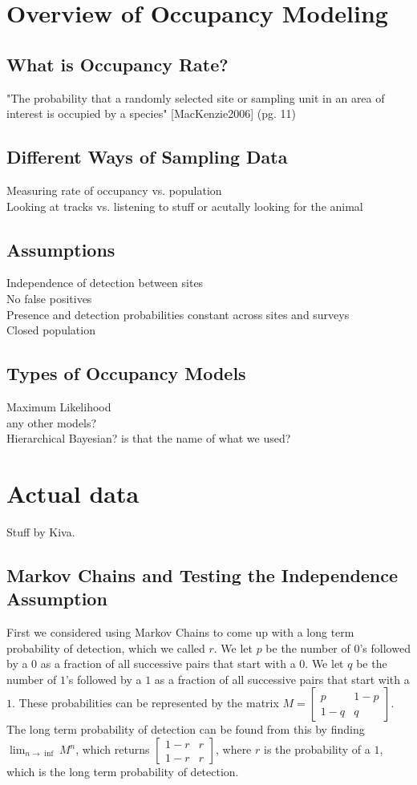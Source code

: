 \documentclass{article}
\begin{document}
\section{Overview of Occupancy Modeling}
	\subsection{What is Occupancy Rate?}
		"The probability that a randomly selected site or sampling unit in an area 
			of interest is occupied by a species" [MacKenzie2006] (pg. 11)
	\subsection{Different Ways of Sampling Data}
		Measuring rate of occupancy vs. population \\
		Looking at tracks vs. listening to stuff or acutally looking for the animal
	\subsection{Assumptions}
		Independence of detection between sites \\
		No false positives \\
		Presence and detection probabilities constant across sites and surveys \\
		Closed population
	\subsection{Types of Occupancy Models}
		Maximum Likelihood \\
		any other models? \\
		Hierarchical Bayesian?  is that the name of what we used?

\section{Actual data}
Stuff by Kiva.
	\subsection{Markov Chains and Testing the Independence Assumption}

		First we considered using Markov Chains to come up with a long term 
probability of detection, which we called \(r\).  We let \(p\) be the number of 
\(0\)'s followed by a \(0\) as a fraction of all successive pairs that start with 
a \(0\).  We let \(q\) be the number of \(1\)'s followed by a \(1\) as a fraction 
of all successive pairs that start with a \(1\).  These probabilities can be
represented by the matrix \(M = \begin{bmatrix} p & 1-p \\ 1-q & q 
\end{bmatrix}\). The long term probability of detection can be found from this by finding 
\(\lim_{n \to \inf} M^n\), which returns \( \begin{bmatrix} 1-r & r \\ 1-r & r 
\end{bmatrix}\), where \(r\) is the probability of a \(1\), which is the long 
term probability of detection.  
\end{document}
